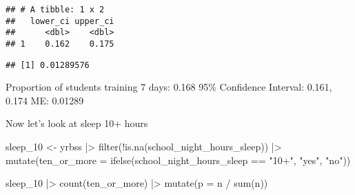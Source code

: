 \documentclass[
]{article}
\newenvironment{Shaded}{\begin{snugshade}}{\end{snugshade}}
\newcommand{\AttributeTok}[1]{\textcolor[rgb]{0.77,0.63,0.00}{#1}}
\newcommand{\DecValTok}[1]{\textcolor[rgb]{0.00,0.00,0.81}{#1}}
\newcommand{\FloatTok}[1]{\textcolor[rgb]{0.00,0.00,0.81}{#1}}
\newcommand{\FunctionTok}[1]{\textcolor[rgb]{0.00,0.00,0.00}{#1}}
\newcommand{\NormalTok}[1]{#1}
\newcommand{\OtherTok}[1]{\textcolor[rgb]{0.56,0.35,0.01}{#1}}
\newcommand{\SpecialCharTok}[1]{\textcolor[rgb]{0.00,0.00,0.00}{#1}}
\newcommand{\StringTok}[1]{\textcolor[rgb]{0.31,0.60,0.02}{#1}}
\begin{document}
\begin{verbatim}
## # A tibble: 1 x 2
##   lower_ci upper_ci
##      <dbl>    <dbl>
## 1    0.162    0.175
\end{verbatim}

\begin{Shaded}
\end{Shaded}

\begin{verbatim}
## [1] 0.01289576
\end{verbatim}

Proportion of students training 7 days: 0.168 95\% Confidence Interval:
0.161, 0.174 ME: 0.01289

Now let's look at sleep 10+ hours

\begin{Shaded}
\begin{Highlighting}[]
\NormalTok{sleep\_10 }\OtherTok{\textless{}{-}}\NormalTok{ yrbss }\SpecialCharTok{|\textgreater{}}
  \FunctionTok{filter}\NormalTok{(}\SpecialCharTok{!}\FunctionTok{is.na}\NormalTok{(school\_night\_hours\_sleep)) }\SpecialCharTok{|\textgreater{}}
  \FunctionTok{mutate}\NormalTok{(}\AttributeTok{ten\_or\_more =} \FunctionTok{ifelse}\NormalTok{(school\_night\_hours\_sleep }\SpecialCharTok{==} \StringTok{"10+"}\NormalTok{, }\StringTok{"yes"}\NormalTok{, }\StringTok{"no"}\NormalTok{))}

\NormalTok{sleep\_10 }\SpecialCharTok{|\textgreater{}}
  \FunctionTok{count}\NormalTok{(ten\_or\_more) }\SpecialCharTok{|\textgreater{}}
  \FunctionTok{mutate}\NormalTok{(}\AttributeTok{p =}\NormalTok{ n }\SpecialCharTok{/} \FunctionTok{sum}\NormalTok{(n))}
\end{Highlighting}
\end{Shaded}
\end{document}
